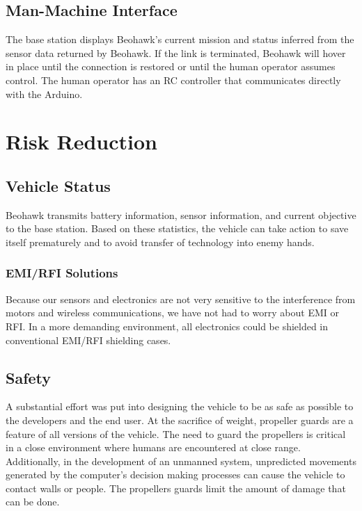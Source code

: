 \documentclass[12pt, letterpaper]{article}
\begin{document}
\subsection{Man-Machine Interface}
The base station displays Beohawk's current mission and status inferred from the sensor data returned by Beohawk.  If the link is terminated, Beohawk will  hover in place until the connection is restored or until the human operator assumes control. The human operator has an RC controller that communicates directly with the Arduino.


\section{Risk Reduction}
\subsection{Vehicle Status}
Beohawk transmits battery information, sensor information, and current objective to the base station. Based on these statistics, the vehicle can take action to save itself prematurely and to avoid transfer of technology into enemy hands. 

\subsubsection{EMI/RFI Solutions}
Because our sensors and electronics are not very sensitive to the interference from motors and wireless communications, we have not had to worry about EMI or RFI. In a more demanding environment, all electronics could be shielded in conventional EMI/RFI shielding cases.

\subsection{Safety}
A substantial effort was put into designing the vehicle to be as safe as possible to the developers and the end user. At the sacrifice of weight, propeller guards are a feature of all versions of the vehicle. The need to guard the propellers is critical in a close environment where humans are encountered at close range. Additionally, in the development of an unmanned system, unpredicted movements generated by the computer's decision making processes can cause the vehicle to contact walls or people. The propellers guards limit the amount of damage that can be done.
\end{document}

